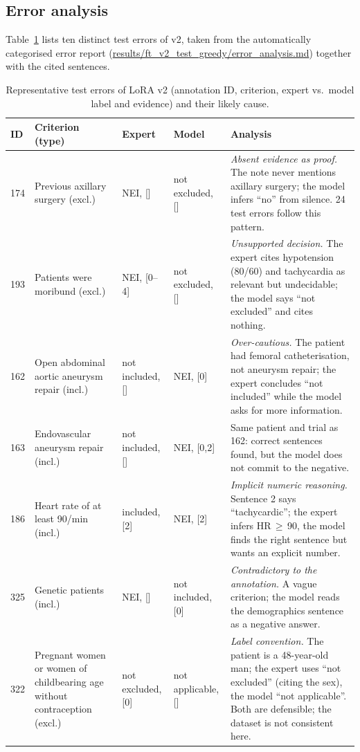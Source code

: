 \documentclass[conference]{IEEEtran}
\begin{document}
\subsection{Error analysis}
Table~\ref{tab:errors} lists ten distinct test errors of v2, taken from the automatically categorised error report (\url{results/ft_v2_test_greedy/error_analysis.md}) together with the cited sentences.

\begin{table}[t]
\centering
\caption{Representative test errors of LoRA v2 (annotation ID, criterion, expert vs.\ model label and evidence) and their likely cause.}
\label{tab:errors}
\footnotesize
\setlength{\tabcolsep}{3pt}
\begin{tabular}{@{}p{0.6cm}p{4.4cm}p{2.4cm}p{2.4cm}p{6.9cm}@{}}
\toprule
ID & Criterion (type) & Expert & Model & Analysis \\
\midrule
174 & Previous axillary surgery (excl.) & NEI, [] & not excluded, [] & \emph{Absent evidence as proof.} The note never mentions axillary surgery; the model infers ``no'' from silence. 24 test errors follow this pattern. \\
193 & Patients were moribund (excl.) & NEI, [0--4] & not excluded, [] & \emph{Unsupported decision.} The expert cites hypotension (80/60) and tachycardia as relevant but undecidable; the model says ``not excluded'' and cites nothing. \\
162 & Open abdominal aortic aneurysm repair (incl.) & not included, [] & NEI, [0] & \emph{Over-cautious.} The patient had femoral catheterisation, not aneurysm repair; the expert concludes ``not included'' while the model asks for more information. \\
163 & Endovascular aneurysm repair (incl.) & not included, [] & NEI, [0,2] & Same patient and trial as 162: correct sentences found, but the model does not commit to the negative. \\
186 & Heart rate of at least 90/min (incl.) & included, [2] & NEI, [2] & \emph{Implicit numeric reasoning.} Sentence 2 says ``tachycardic''; the expert infers HR\,$\geq$\,90, the model finds the right sentence but wants an explicit number. \\
325 & Genetic patients (incl.) & NEI, [] & not included, [0] & \emph{Contradictory to the annotation.} A vague criterion; the model reads the demographics sentence as a negative answer. \\
322 & Pregnant women or women of childbearing age without contraception (excl.) & not excluded, [0] & not applicable, [] & \emph{Label convention.} The patient is a 48-year-old man; the expert uses ``not excluded'' (citing the sex), the model ``not applicable''. Both are defensible; the dataset is not consistent here. \\

\end{tabular}
\end{table}
\end{document}

